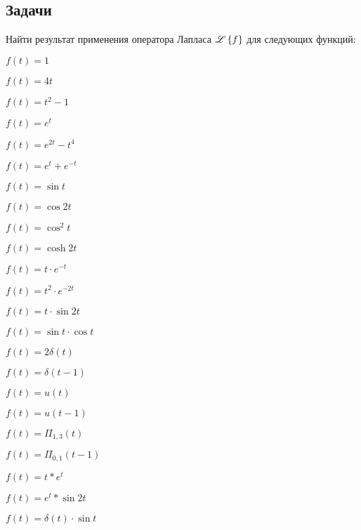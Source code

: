 \subsection{Задачи}

	Найти результат применения оператора Лапласа $\mathscr{L} \left\lbrace {f} \right\rbrace$ для следующих функций:

	\begin{multicols}{3}
		\begin{enumtasks}

			\item \( f(t) = 1 \)
			\item \( f(t) = 4t \)
			\item \( f(t) = t^2 - 1 \)
			\item \( f(t) = e^{t} \)
			\item \( f(t) = e^{2t} - t^4 \)
			\item \( f(t) = e^t + e^{-t} \)
			\item \( f(t) = \sin{t} \)
			\item \( f(t) = \cos{2t} \)
			\item \( f(t) = \cos^2{t} \)
			\item \( f(t) = \cosh{2t} \)
			\item \( f(t) = t \cdot e^{-t} \)
			\item \( f(t) = t^2 \cdot e^{-2t} \)
			\item \( f(t) = t \cdot \sin{2t} \)
			\item \( f(t) = \sin{t} \cdot \cos{t} \)

		\end{enumtasks}
	\end{multicols}

	\vspace{15pt}

	\begin{multicols}{3}
		\begin{enumtasks}

			\item \( f(t) = 2\delta(t) \)
			\item \( f(t) = \delta(t-1) \)
			\item \( f(t) = u(t) \)
			\item \( f(t) = u(t-1) \)
			\item \( f(t) = \Pi_{1,3}(t) \)
			\item \( f(t) = \Pi_{0,1}(t-1) \)
			\item \( f(t) = t * e^t \)
			\item \( f(t) = e^t * \sin{2t} \)
			\item \( f(t) = \delta(t) \cdot \sin{t} \)

		\end{enumtasks}
	\end{multicols}

